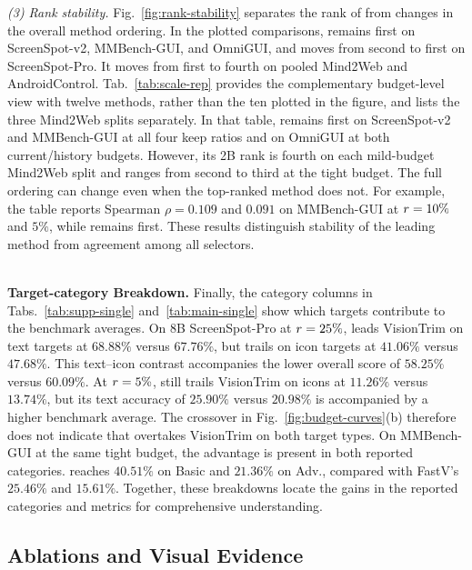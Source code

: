 \noindent\textit{(3) Rank stability.}
Fig.~\ref{fig:rank-stability} separates the rank of \method{} from changes in the overall method ordering.
%
In the plotted comparisons, \method{} remains first on ScreenSpot-v2, MMBench-GUI, and OmniGUI, and moves from second to first on ScreenSpot-Pro.
%
It moves from first to fourth on pooled Mind2Web and AndroidControl.
%
Tab.~\ref{tab:scale-rep} provides the complementary budget-level view with twelve methods, rather than the ten plotted in the figure, and lists the three Mind2Web splits separately.
%
In that table, \method{} remains first on ScreenSpot-v2 and MMBench-GUI at all four keep ratios and on OmniGUI at both current/history budgets.
%
However, its 2B rank is fourth on each mild-budget Mind2Web split and ranges from second to third at the tight budget.
%
The full ordering can change even when the top-ranked method does not. For example, the table reports Spearman $\rho=0.109$ and $0.091$ on MMBench-GUI at $r=10\%$ and $5\%$, while \method{} remains first.
%
These results distinguish stability of the leading method from agreement among all selectors.



\\
\noindent\textbf{Target-category Breakdown.}
Finally, the category columns in Tabs.~\ref{tab:supp-single} and~\ref{tab:main-single} show which targets contribute to the benchmark averages.
%
On 8B ScreenSpot-Pro at $r=25\%$, \method{} leads VisionTrim on text targets at $68.88\%$ versus $67.76\%$, but trails on icon targets at $41.06\%$ versus $47.68\%$.
%
This text--icon contrast accompanies the lower overall score of $58.25\%$ versus $60.09\%$.
%
At $r=5\%$, \method{} still trails VisionTrim on icons at $11.26\%$ versus $13.74\%$, but its text accuracy of $25.90\%$ versus $20.98\%$ is accompanied by a higher benchmark average.
%
The crossover in Fig.~\ref{fig:budget-curves}(b) therefore does not indicate that \method{} overtakes VisionTrim on both target types.
%
On MMBench-GUI at the same tight budget, the advantage is present in both reported categories. \method{} reaches $40.51\%$ on Basic and $21.36\%$ on Adv., compared with FastV's $25.46\%$ and $15.61\%$.
%
Together, these breakdowns locate the gains in the reported categories and metrics for comprehensive understanding.
\subsection{Ablations and Visual Evidence}
\label{app:supp-ablation}

